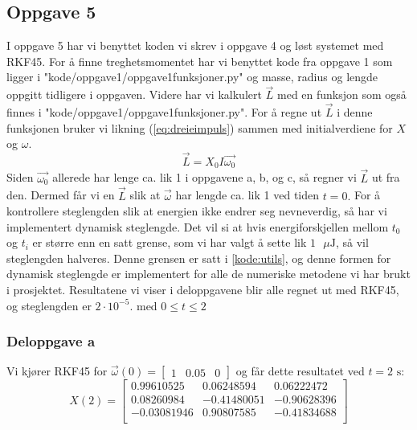 \subsection{Oppgave 5}
\label{section:oppgave5}
I oppgave 5 har vi benyttet koden vi skrev i oppgave 4 og løst systemet med RKF45. \newline\newline
For å finne treghetsmomentet har vi benyttet kode fra oppgave 1 som ligger i "kode/oppgave1/oppgave1funksjoner.py" og masse, radius og lengde oppgitt tidligere i oppgaven. Videre har vi kalkulert $\vec{L}$ med en funksjon som også finnes i "kode/oppgave1/oppgave1funksjoner.py". For å regne ut $\vec{L}$ i denne funksjonen bruker vi likning (\ref{eq:dreieimpuls}) sammen med initialverdiene for $X$ og $\omega.$
\begin{equation}
\vec{L} = X_0I\vec{\omega_0}
\end{equation}
Siden $\vec{\omega_0}$ allerede har lenge ca. lik 1 i oppgavene a, b, og c, så regner vi $\vec{L}$ ut fra den. Dermed får vi en $\vec{L}$ slik at $\vec{\omega}$ har lengde ca. lik 1 ved tiden $t=0.$\newline\newline
For å kontrollere steglengden slik at energien ikke endrer seg nevneverdig, så har vi implementert dynamisk steglengde. Det vil si at hvis energiforskjellen mellom $t_0$ og $t_{i}$ er større enn en satt grense, som vi har valgt å sette lik $1\text{ }\mu\text{J}$, så vil steglengden halveres. Denne grensen er satt i \ref{kode:utils}, og denne formen for dynamisk steglengde er implementert for alle de numeriske metodene vi har brukt i prosjektet. Resultatene vi viser i deloppgavene blir alle regnet ut med RKF45, og steglengden er $2\cdot10^{-5}.$ med $0\leq t \leq 2$
\subsubsection{Deloppgave a}
Vi kjører RKF45 for $\vec{\omega}(0)=\begin{bmatrix}1&0.05&0\end{bmatrix}$ og får dette resultatet ved $t=2\text{ s}:$
\begin{equation}
X(2)=
\begin{bmatrix}
0.99610525 &  0.06248594 & 0.06222472\\
0.08260984 & -0.41480051 & -0.90628396\\
-0.03081946 & 0.90807585 & -0.41834688\\
\end{bmatrix}
\end{equation}
